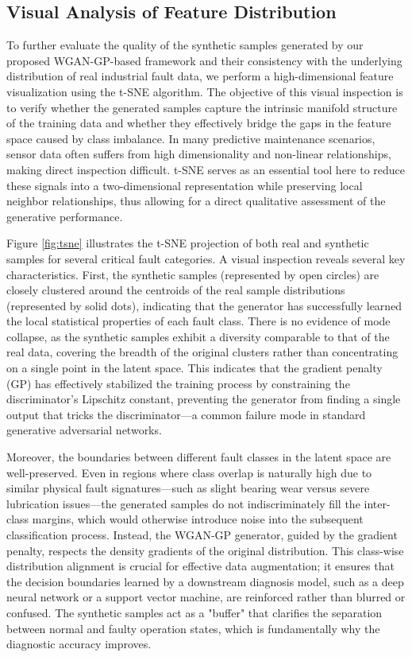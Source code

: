 \subsection{Visual Analysis of Feature Distribution}
\label{subsec:visual_analysis}

To further evaluate the quality of the synthetic samples generated by our proposed WGAN-GP-based framework and their consistency with the underlying distribution of real industrial fault data, we perform a high-dimensional feature visualization using the t-SNE \cite{Maaten2008} algorithm. The objective of this visual inspection is to verify whether the generated samples capture the intrinsic manifold structure of the training data and whether they effectively bridge the gaps in the feature space caused by class imbalance. In many predictive maintenance scenarios, sensor data often suffers from high dimensionality and non-linear relationships, making direct inspection difficult. t-SNE serves as an essential tool here to reduce these signals into a two-dimensional representation while preserving local neighbor relationships, thus allowing for a direct qualitative assessment of the generative performance.

Figure \ref{fig:tsne} illustrates the t-SNE projection of both real and synthetic samples for several critical fault categories. A visual inspection reveals several key characteristics. First, the synthetic samples (represented by open circles) are closely clustered around the centroids of the real sample distributions (represented by solid dots), indicating that the generator has successfully learned the local statistical properties of each fault class. There is no evidence of mode collapse, as the synthetic samples exhibit a diversity comparable to that of the real data, covering the breadth of the original clusters rather than concentrating on a single point in the latent space. This indicates that the gradient penalty (GP) has effectively stabilized the training process by constraining the discriminator's Lipschitz constant, preventing the generator from finding a single output that tricks the discriminator—a common failure mode in standard generative adversarial networks.

Moreover, the boundaries between different fault classes in the latent space are well-preserved. Even in regions where class overlap is naturally high due to similar physical fault signatures—such as slight bearing wear versus severe lubrication issues—the generated samples do not indiscriminately fill the inter-class margins, which would otherwise introduce noise into the subsequent classification process. Instead, the WGAN-GP generator, guided by the gradient penalty, respects the density gradients of the original distribution. This class-wise distribution alignment is crucial for effective data augmentation; it ensures that the decision boundaries learned by a downstream diagnosis model, such as a deep neural network or a support vector machine, are reinforced rather than blurred or confused. The synthetic samples act as a "buffer" that clarifies the separation between normal and faulty operation states, which is fundamentally why the diagnostic accuracy improves.

